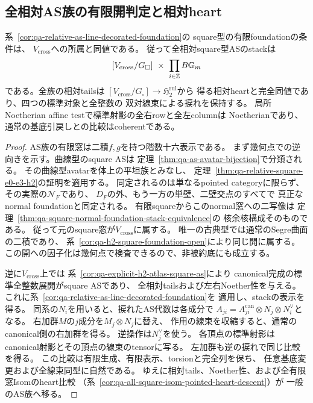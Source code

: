 \subsection{全相対AS族の有限開判定と相対heart}
\label{subsec:qa-all-as-relative-hearts}

\begin{theorem}[全square型の有限窓と相対heart]
\label{thm:qa-all-relative-square-as-heart}
系~\ref{cor:qa-relative-as-line-decorated-foundation}の
square型の有限foundationの条件は、
$V_{\mathrm{cross}}$への所属と同値である。
従って全相対square型ASのstackは
\[
 [V_{\mathrm{cross}}/G_\square]\ \times\
 \prod_{i\in\mathbb Z}B\mathbb G_m
\]
である。全族の相対tailsは
$[V_{\mathrm{cross}}/G_\square]\to\mathfrak H_2^{\mathrm{rul}}$から
得る相対heartと完全同値であり、四つの標準対象と全整数の
双対線束による捩れを保持する。
局所Noetherian affine testで標準射影の全右rowと全左columnは
Noetherianであり、通常の基底引戻しとの比較はcoherentである。
\end{theorem}
\begin{proof}
AS族の有限窓は二積$f,g$を持つ階数十六表示である。
まず幾何点での逆向きを示す。曲線型のsquare ASは
定理~\ref{thm:qa-as-avatar-bijection}で分類される。
その曲線型avatarを体上の平坦族とみなし、
定理~\ref{thm:qa-relative-square-e0-e3-h2}の証明を適用する。
同定されるのは単なるpointed categoryに限らず、
その実際の$\mathcal N_F$であり、
$D_F$の外、もう一方の単壁、二壁交点のすべてで
真正なnormal foundationと同定される。
有限squareからこのnormal窓への二写像は
定理~\ref{thm:qa-square-normal-foundation-stack-equivalence}の
核余核構成そのものである。
従って元のsquare窓が$V_{\mathrm{cross}}$に属する。
唯一の古典型では通常のSegre曲面の二積であり、
系~\ref{cor:qa-h2-square-foundation-open}により同じ開に属する。
この開への因子化は幾何点で検査できるので、非被約底にも成立する。

逆に$V_{\mathrm{cross}}$上では
系~\ref{cor:qa-explicit-h2-atlas-square-as}により
canonical完成の標準全整数展開がsquare ASであり、
全相対tailsおよび左右Noether性を与える。
これに系~\ref{cor:qa-relative-as-line-decorated-foundation}を
適用し、stackの表示を得る。
同系の$N_i$を用いると、捩れたAS代数は各成分で
$A_{ji}=A^{\mathrm{can}}_{ji}\otimes N_j\otimes N_i^\vee$となる。
右加群$M$の$j$成分を$M_j\otimes N_j$に替え、
作用の線束を収縮すると、通常のcanonical側の右加群を得る。
逆操作は$N_j^\vee$を使う。
各頂点の標準射影はcanonical射影とその頂点の線束のtensorに写る。
左加群も逆の捩れで同じ比較を得る。
この比較は有限生成、有限表示、torsionと完全列を保ち、
任意基底変更および全線束同型に自然である。
ゆえに相対tails、Noether性、および全有限窓Isomのheart比較
（系~\ref{cor:qa-all-square-isom-pointed-heart-descent}）が
一般のAS族へ移る。
\end{proof}

